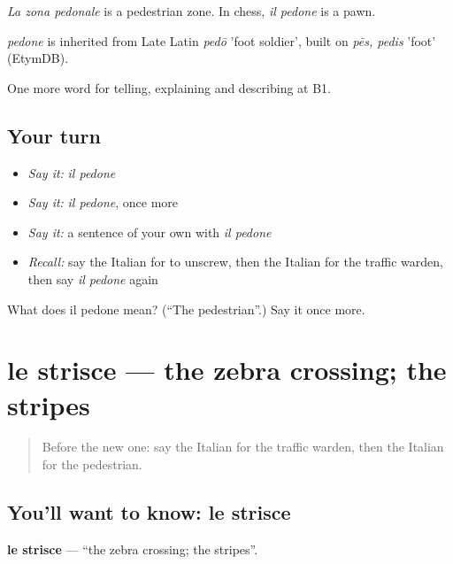 \emph{La zona pedonale} is a pedestrian zone. In chess, \emph{il pedone} is a pawn.

\begin{cousinweb}
\emph{pedone} is inherited from Late Latin \emph{pedō} 'foot soldier', built on \emph{pēs, pedis} 'foot' (EtymDB).
\end{cousinweb}

\begin{grammarlens}[title={What you've built}]
One more word for telling, explaining and describing at B1.
\end{grammarlens}

\subsection*{Your turn}
\begin{itemize}
\raggedright
  \item \emph{Say it:} \emph{il pedone}
  \item \emph{Say it:} \emph{il pedone}, once more
  \item \emph{Say it:} a sentence of your own with \emph{il pedone}
  \item \emph{Recall:} say the Italian for to unscrew, then the Italian for the traffic warden, then say \emph{il pedone} again
\end{itemize}

\begin{tcolorbox}[breakable,colback=teal!4,colframe=teal!35!black,title={Before you move on}]
What does il pedone mean? (\textquotedblleft{}The pedestrian\textquotedblright{}.) Say it once more.
\end{tcolorbox}
\section[le strisce]{le strisce — the zebra crossing; the stripes}

\label{lesson:IT-C412-strisce}



\begin{quote}
Before the new one: say the Italian for the traffic warden, then the Italian for the pedestrian.
\end{quote}

\subsection*{You'll want to know: le strisce}
\textbf{le strisce} — \textquotedblleft{}the zebra crossing; the stripes\textquotedblright{}.

